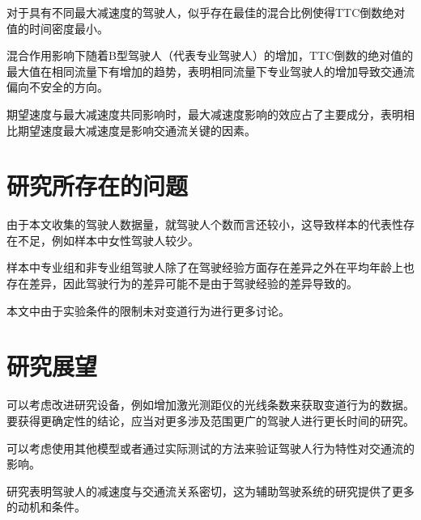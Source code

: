对于具有不同最大减速度的驾驶人，似乎存在最佳的混合比例使得TTC倒数绝对值的时间密度最小。

混合作用影响下随着B型驾驶人（代表专业驾驶人）的增加，TTC倒数的绝对值的最大值在相同流量下有增加的趋势，表明相同流量下专业驾驶人的增加导致交通流偏向不安全的方向。

期望速度与最大减速度共同影响时，最大减速度影响的效应占了主要成分，表明相比期望速度最大减速度是影响交通流关键的因素。


\section{研究所存在的问题}

由于本文收集的驾驶人数据量，就驾驶人个数而言还较小，这导致样本的代表性存在不足，例如样本中女性驾驶人较少。

样本中专业组和非专业组驾驶人除了在驾驶经验方面存在差异之外在平均年龄上也存在差异，因此驾驶行为的差异可能不是由于驾驶经验的差异导致的。

本文中由于实验条件的限制未对变道行为进行更多讨论。




\section{研究展望}

可以考虑改进研究设备，例如增加激光测距仪的光线条数来获取变道行为的数据。要获得更确定性的结论，应当对更多涉及范围更广的驾驶人进行更长时间的研究。

可以考虑使用其他模型或者通过实际测试的方法来验证驾驶人行为特性对交通流的影响。

研究表明驾驶人的减速度与交通流关系密切，这为辅助驾驶系统的研究提供了更多的动机和条件。


